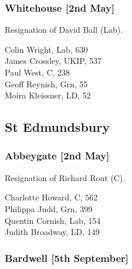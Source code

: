 \documentclass[a4paper,openany,10pt]{book}
\begin{document}
\subsubsection*{Whitehouse \hspace*{\fill}\nolinebreak[1]%
\enspace\hspace*{\fill}
[2nd May]}


Resignation of David Ball (Lab).



Colin Wright, Lab, 630\\
James Crossley, UKIP, 537\\
Paul West, C, 238\\
Geoff Reynish, Grn, 55\\
Moira Kleissner, LD, 52\\


\subsection*{St Edmundsbury}

\subsubsection*{Abbeygate \hspace*{\fill}\nolinebreak[1]%
\enspace\hspace*{\fill}
[2nd May]}


Resignation of Richard Rout (C).



Charlotte Howard, C, 562\\
Philippa Judd, Grn, 399\\
Quentin Cornish, Lab, 154\\
Judith Broadway, LD, 149\\


\subsubsection*{Bardwell\hspace*{\fill}\nolinebreak[1]%
\enspace\hspace*{\fill}
[5th September]}

\end{document}
